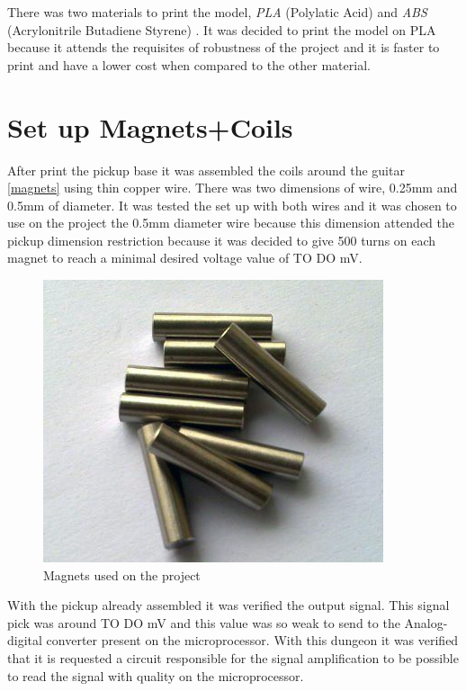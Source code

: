 There was two materials to print the model, \textit{PLA} (Polylatic Acid) \cite{3d-materials}
and \textit{ABS} (Acrylonitrile Butadiene Styrene) \cite{3d-materials}. It was decided to print
the model on PLA because it attends the requisites of robustness of the project and it is
faster to print and have a lower cost when compared to the other material.

\section{Set up Magnets+Coils}

After print the pickup base it was assembled the coils around the guitar \autoref{magnets}
using thin copper wire. There was two dimensions of wire, 0.25mm and 0.5mm of diameter. It was
tested the set up with both wires and it was chosen to use on the project the 0.5mm
diameter wire because this dimension attended the pickup dimension restriction because it was
decided to give 500 turns on each magnet to reach a minimal desired voltage value of TO DO mV.

\begin{figure}[!htpb]
\centering
\caption{Magnets used on the project}
\label{magnets}
\includegraphics[scale=0.3]{images/magnets}
\end{figure}

With the pickup already assembled it was verified the output signal. This signal
pick was around TO DO mV and this value was so weak to send to the Analog-digital
converter present on the microprocessor. With this dungeon it was verified that
it is requested a circuit responsible for the signal amplification to be possible to
read the signal with quality on the microprocessor.
